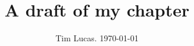 \documentclass[a4paper,10pt,reqno]{amsart}
\begin{document}
\title{A draft of my chapter}
\author{Tim Lucas. \today}
\date{}

\maketitle







\small
\printbibliography 
\end{document}
